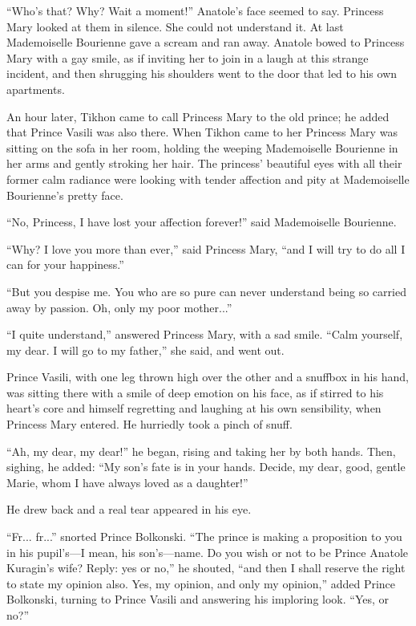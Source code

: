 ``Who's that? Why? Wait a moment!'' Anatole's face seemed to
say. Princess Mary looked at them in silence. She could not
understand it. At last Mademoiselle Bourienne gave a scream and
ran away. Anatole bowed to Princess Mary with a gay smile, as if
inviting her to join in a laugh at this strange incident, and
then shrugging his shoulders went to the door that led to his own
apartments.

An hour later, Tikhon came to call Princess Mary to the old
prince; he added that Prince Vasili was also there. When Tikhon
came to her Princess Mary was sitting on the sofa in her room,
holding the weeping Mademoiselle Bourienne in her arms and gently
stroking her hair. The princess' beautiful eyes with all their
former calm radiance were looking with tender affection and pity
at Mademoiselle Bourienne's pretty face.

``No, Princess, I have lost your affection forever!'' said
Mademoiselle Bourienne.

``Why? I love you more than ever,'' said Princess Mary, ``and I
will try to do all I can for your happiness.''

``But you despise me. You who are so pure can never understand
being so carried away by passion. Oh, only my poor mother...''

``I quite understand,'' answered Princess Mary, with a sad
smile. ``Calm yourself, my dear. I will go to my father,'' she
said, and went out.

Prince Vasili, with one leg thrown high over the other and a
snuffbox in his hand, was sitting there with a smile of deep
emotion on his face, as if stirred to his heart's core and
himself regretting and laughing at his own sensibility, when
Princess Mary entered. He hurriedly took a pinch of snuff.

``Ah, my dear, my dear!'' he began, rising and taking her by both
hands.  Then, sighing, he added: ``My son's fate is in your
hands. Decide, my dear, good, gentle Marie, whom I have always
loved as a daughter!''

He drew back and a real tear appeared in his eye.

``Fr... fr...'' snorted Prince Bolkonski. ``The prince is making
a proposition to you in his pupil's---I mean, his
son's---name. Do you wish or not to be Prince Anatole Kuragin's
wife? Reply: yes or no,'' he shouted, ``and then I shall reserve
the right to state my opinion also.  Yes, my opinion, and only my
opinion,'' added Prince Bolkonski, turning to Prince Vasili and
answering his imploring look. ``Yes, or no?''

